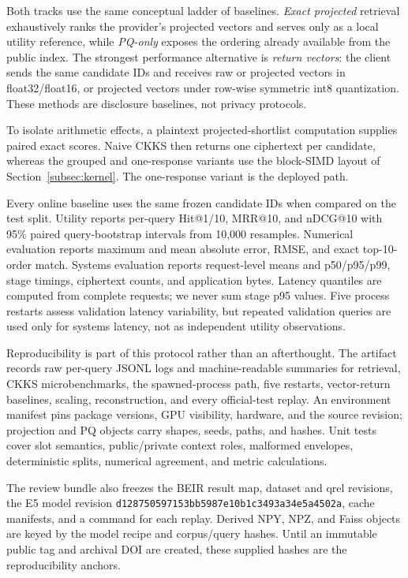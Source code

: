 \documentclass[pdflatex,sn-basic,Numbered]{sn-jnl}
\theoremstyle{plain}
\begin{document}
Both tracks use the same conceptual ladder of baselines. \emph{Exact projected} retrieval exhaustively ranks the provider's projected vectors and serves only as a local utility reference, while \emph{PQ-only} exposes the ordering already available from the public index. The strongest performance alternative is \emph{return vectors}: the client sends the same candidate IDs and receives raw or projected vectors in float32/float16, or projected vectors under row-wise symmetric int8 quantization. These methods are disclosure baselines, not privacy protocols.

To isolate arithmetic effects, a plaintext projected-shortlist computation supplies paired exact scores. Naive CKKS then returns one ciphertext per candidate, whereas the grouped and one-response variants use the block-SIMD layout of Section~\ref{subsec:kernel}. The one-response variant is the deployed path.

Every online baseline uses the same frozen candidate IDs when compared on the test split. Utility reports per-query Hit@1/10, MRR@10, and nDCG@10 with 95\% paired query-bootstrap intervals from 10,000 resamples. Numerical evaluation reports maximum and mean absolute error, RMSE, and exact top-10-order match. Systems evaluation reports request-level means and p50/p95/p99, stage timings, ciphertext counts, and application bytes. Latency quantiles are computed from complete requests; we never sum stage p95 values. Five process restarts assess validation latency variability, but repeated validation queries are used only for systems latency, not as independent utility observations.

Reproducibility is part of this protocol rather than an afterthought. The artifact records raw per-query JSONL logs and machine-readable summaries for retrieval, CKKS microbenchmarks, the spawned-process path, five restarts, vector-return baselines, scaling, reconstruction, and every official-test replay. An environment manifest pins package versions, GPU visibility, hardware, and the source revision; projection and PQ objects carry shapes, seeds, paths, and hashes. Unit tests cover slot semantics, public/private context roles, malformed envelopes, deterministic splits, numerical agreement, and metric calculations.

The review bundle also freezes the BEIR result map, dataset and qrel revisions, the E5 model revision \texttt{d128750597153bb5987e10b1c3493a34e5a4502a}, cache manifests, and a command for each replay. Derived NPY, NPZ, and Faiss objects are keyed by the model recipe and corpus/query hashes. Until an immutable public tag and archival DOI are created, these supplied hashes are the reproducibility anchors.
\end{document}
